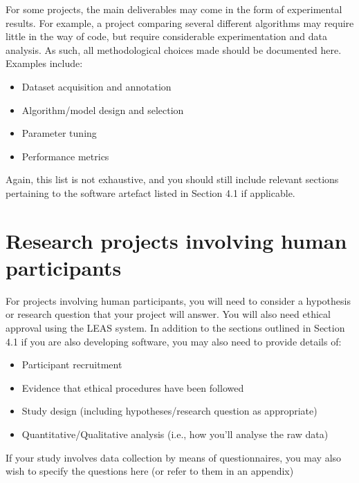For some projects, the main deliverables may come in the form of experimental results. For example, a project comparing several different algorithms may require little in the way of code, but require considerable experimentation and data analysis. As such, all methodological choices made should be documented here. Examples include:
\begin{itemize}
    \item Dataset acquisition and annotation
    \item Algorithm/model design and selection
    \item Parameter tuning
    \item Performance metrics
\end{itemize}
Again, this list is not exhaustive, and you should still include relevant sections pertaining to the software artefact listed in Section 4.1 if applicable.



\section{Research projects involving human participants}

For projects involving human participants, you will need to consider a hypothesis or research question that your project will answer. You will also need ethical approval using the LEAS system. In addition to the sections outlined in Section 4.1 if you are also developing software, you may also need to provide details of:
\begin{itemize}
    \item Participant recruitment
    \item Evidence that ethical procedures have been followed
    \item Study design (including hypotheses/research question as appropriate)
    \item Quantitative/Qualitative analysis (i.e., how you'll analyse the raw data)
\end{itemize}
If your study involves data collection by means of questionnaires, you may also wish to specify the questions here (or refer to them in an appendix)


